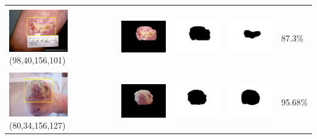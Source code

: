 \begin{table}[H]
\begin{tabular}{|m{1.0in}|m{1.0in}|m{1.0in}|m{1.0in}|m{0.6in}|}
		&  &  & \\
		\includegraphics[width=1.0in]{gambar/hasil_segmentasi/luka_kuning/image_38_rect.jpg} {\centering\fontsize{10}{10}\selectfont(98,40,156,101)}&
		\includegraphics[width=1.0in]{gambar/hasil_segmentasi/luka_kuning/result_38.jpg}&
		\includegraphics[width=1.0in]{gambar/hasil_segmentasi/luka_kuning/mask_r_38.jpg}&
		\includegraphics[width=1.0in]{gambar/hasil_segmentasi/luka_kuning/38_r.jpg}&
		87.3\% \\
		\hline

		&  &  & \\
		\includegraphics[width=1.0in]{gambar/hasil_segmentasi/luka_kuning/image_42_rect.jpg} {\centering\fontsize{10}{10}\selectfont(80,34,156,127)}&
		\includegraphics[width=1.0in]{gambar/hasil_segmentasi/luka_kuning/result_42.jpg}&
		\includegraphics[width=1.0in]{gambar/hasil_segmentasi/luka_kuning/mask_r_42.jpg}&
		\includegraphics[width=1.0in]{gambar/hasil_segmentasi/luka_kuning/42_r.jpg}&
		95.68\% \\
		\hline


\end{tabular}
\end{table}
